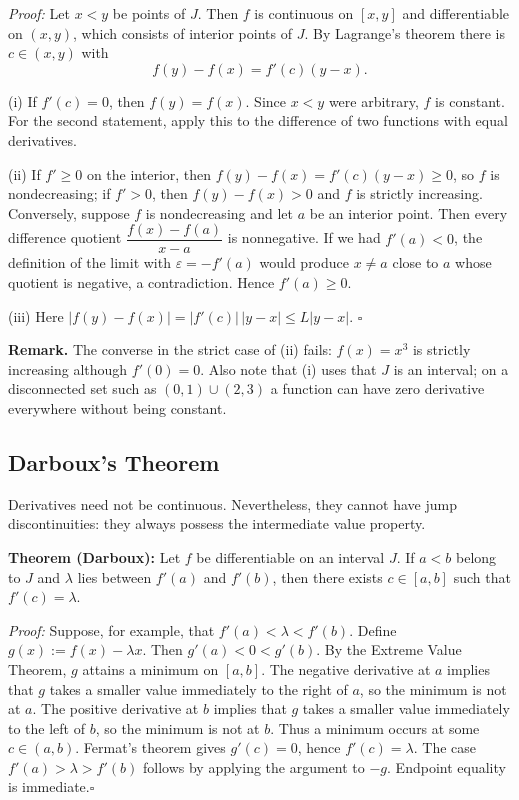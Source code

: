 \documentclass[a4paper,11pt,abstracton]{scrartcl}
\theoremstyle{dotlessP}
\theoremstyle{dotlessS}
\theoremstyle{remark}
\theoremstyle{definition}
\begin{document}
\begin{claim_box}
\textit{Proof:}
Let $x<y$ be points of $J$. Then $f$ is continuous on $[x,y]$ and differentiable on $(x,y)$, which consists of interior points of $J$. By Lagrange's theorem there is $c\in(x,y)$ with
\[
    f(y)-f(x)=f'(c)(y-x).
\]

(i) If $f'(c)=0$, then $f(y)=f(x)$. Since $x<y$ were arbitrary, $f$ is constant. For the second statement, apply this to the difference of two functions with equal derivatives.

(ii) If $f'\ge0$ on the interior, then $f(y)-f(x)=f'(c)(y-x)\ge0$, so $f$ is nondecreasing; if $f'>0$, then $f(y)-f(x)>0$ and $f$ is strictly increasing. Conversely, suppose $f$ is nondecreasing and let $a$ be an interior point. Then every difference quotient $\dfrac{f(x)-f(a)}{x-a}$ is nonnegative. If we had $f'(a)<0$, the definition of the limit with $\varepsilon=-f'(a)$ would produce $x\ne a$ close to $a$ whose quotient is negative, a contradiction. Hence $f'(a)\ge0$.

(iii) Here $|f(y)-f(x)|=|f'(c)|\,|y-x|\le L|y-x|$.
\hfill$\square$
\end{claim_box}

\begin{remark_box}
\textbf{Remark.} The converse in the strict case of (ii) fails: $f(x)=x^3$ is strictly increasing although $f'(0)=0$. Also note that (i) uses that $J$ is an interval; on a disconnected set such as $(0,1)\cup(2,3)$ a function can have zero derivative everywhere without being constant.
\end{remark_box}

\subsection{Darboux's Theorem}

Derivatives need not be continuous. Nevertheless, they cannot have
jump discontinuities: they always possess the intermediate value
property.

\begin{problem_box}
\textbf{Theorem (Darboux):} Let $f$ be differentiable on an interval
$J$. If $a<b$ belong to $J$ and $\lambda$ lies between $f'(a)$ and
$f'(b)$, then there exists $c\in[a,b]$ such that $f'(c)=\lambda$.
\end{problem_box}

\begin{claim_box}
\textit{Proof:} Suppose, for example, that $f'(a)<\lambda<f'(b)$.
Define $g(x):=f(x)-\lambda x$. Then $g'(a)<0<g'(b)$. By the
Extreme Value Theorem, $g$ attains a minimum on $[a,b]$. The negative
derivative at $a$ implies that $g$ takes a smaller value immediately
to the right of $a$, so the minimum is not at $a$. The positive
derivative at $b$ implies that $g$ takes a smaller value immediately
to the left of $b$, so the minimum is not at $b$. Thus a minimum occurs
at some $c\in(a,b)$. Fermat's theorem gives $g'(c)=0$, hence
$f'(c)=\lambda$. The case $f'(a)>\lambda>f'(b)$ follows by applying
the argument to $-g$. Endpoint equality is immediate.\hfill$\square$
\end{claim_box}
\end{document}
